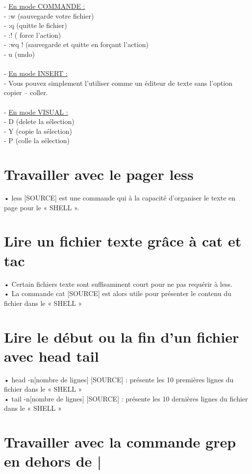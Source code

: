 \documentclass[a4paper, 11pt, french, oneside]{book}
\begin{document}
- \underline{En mode COMMANDE :}\\
- :w (sauvegarde votre fichier)\\
- :q (quitte le fichier)\\
- :! ( force l’action)\\
- :wq ! (sauvegarde et quitte en forçant l’action)\\
- u (undo)\\\\
- \underline{En mode INSERT :}\\
- Vous pouvez simplement l’utiliser comme un éditeur de texte sans l’option copier – coller.\\\\
- \underline{En mode VISUAL :}\\
- D (delete la sélection)\\
- Y (copie la sélection)\\
- P (colle la sélection)\\

\section{\Large Travailler avec le pager less} 

• less [SOURCE] est une commande qui à la capacité d’organiser le texte en page pour le « SHELL ». \\

\section{\Large Lire un fichier texte grâce à cat et tac} 

• Certain fichiers texte sont suffisamment court pour ne pas requérir à less.\\
• La commande cat [SOURCE] est alors utile pour présenter le contenu du fichier dans le « SHELL »\\

\section{\Large Lire le début ou la fin d’un fichier avec head tail} 

• head -n[nombre de lignes] [SOURCE] : présente les 10 premières lignes du fichier dans le
« SHELL »\\
• tail -n[nombre de lignes] [SOURCE] : présente les 10 dernières lignes du fichier dans le
« SHELL »

\section{\Large Travailler avec la commande grep en dehors de |} 
\end{document}
